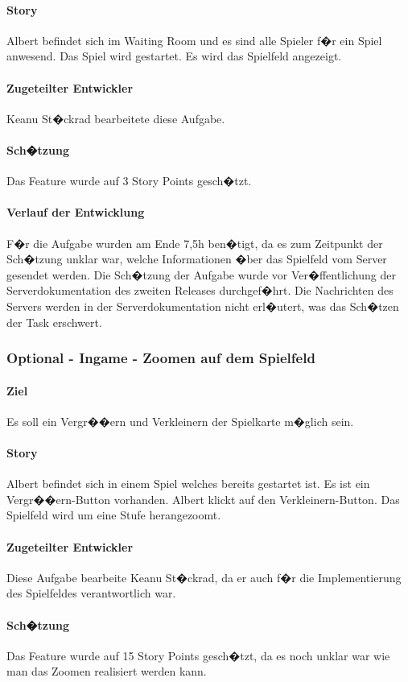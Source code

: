 \documentclass[12pt, titlepage]{scrartcl}
\begin{document}
		\paragraph{Story}Albert befindet sich im Waiting Room und es sind alle Spieler f�r ein Spiel anwesend. Das Spiel wird gestartet. Es wird das Spielfeld angezeigt.
		\paragraph{Zugeteilter Entwickler} Keanu St�ckrad bearbeitete diese Aufgabe.
		\paragraph{Sch�tzung}
		Das Feature wurde auf 3 Story Points gesch�tzt.
		\paragraph{Verlauf der Entwicklung} 
		F�r die Aufgabe wurden am Ende 7,5h ben�tigt, da es zum Zeitpunkt der Sch�tzung unklar war, welche Informationen �ber das Spielfeld vom Server gesendet werden. Die Sch�tzung der Aufgabe wurde vor Ver�ffentlichung der Serverdokumentation des zweiten Releases durchgef�hrt. Die Nachrichten des Servers werden in der Serverdokumentation nicht erl�utert, was das Sch�tzen der Task erschwert.
		
		\subsubsection{Optional - Ingame - Zoomen auf dem Spielfeld}
		\paragraph{Ziel} Es soll ein Vergr��ern und Verkleinern der Spielkarte m�glich sein.
		\paragraph{Story}Albert befindet sich in einem Spiel welches bereits gestartet ist. Es ist ein Vergr��ern-Button vorhanden. Albert klickt auf den Verkleinern-Button. Das Spielfeld wird um eine Stufe herangezoomt.
		\paragraph{Zugeteilter Entwickler} Diese Aufgabe bearbeite Keanu St�ckrad, da er auch f�r die Implementierung des Spielfeldes verantwortlich war.
		\paragraph{Sch�tzung}
		Das Feature wurde auf 15 Story Points gesch�tzt, da es noch unklar war wie man das Zoomen realisiert werden kann.
\end{document}
